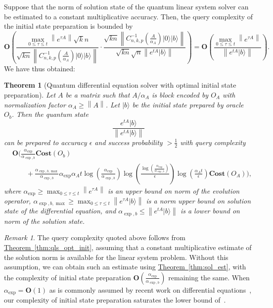 \documentclass[letterpaper,onecolumn,11pt,accepted=2026-02-14]{quantumarticle}
\newcommand{\norm}[1]{\left\lVert#1\right\rVert}
\newtheorem{theorem}{Theorem}
\theoremstyle{remark}
\newtheorem*{remark}{Remark}
\theoremstyle{plain}
\newcommand{\thm}[1]{\hyperref[thm:#1]{Theorem~\ref*{thm:#1}}}
\newcommand{\ket}[1]{|#1\rangle}
\begin{document}
Suppose that the norm of solution state of the quantum linear system solver can be estimated to a constant multiplicative accuracy. Then, the query complexity of the initial state preparation is bounded by
\begin{equation}
    \mathbf{O}\left(\frac{\max_{0\leq\tau\leq t}\norm{e^{\tau A}}\sqrt{k}n}{\sqrt{kn}\norm{C_{n,k,p}^{-1}\left(\frac{A}{\alpha_A}\right)\ket{0}\ket{b}}}
    \cdot\frac{\sqrt{kn}\norm{C_{n,k,p}^{-1}\left(\frac{A}{\alpha_A}\right)\ket{0}\ket{b}}}{\sqrt{kn}\sqrt{n}\norm{e^{tA}\ket{b}}}\right)
    =\mathbf{O}\left(\frac{\max_{0\leq\tau\leq t}\norm{e^{\tau A}}}{\norm{e^{tA}\ket{b}}}\right).
\end{equation}
We have thus obtained:
\begin{theorem}[Quantum differential equation solver with optimal initial state preparation]
\label{thm:diff_eq_init}
Let $A$ be a matrix such that $A/\alpha_A$ is block encoded by $O_A$ with normalization factor $\alpha_A\geq\norm{A}$. Let $\ket{b}$ be the initial state prepared by oracle $O_b$.
Then the quantum state
\begin{equation}
    \frac{e^{tA}\ket{b}}{\norm{e^{tA}\ket{b}}}
\end{equation}
can be prepared to accuracy $\epsilon$ and success probability $>\frac{1}{2}$ with query complexity
\begin{equation}
\begin{aligned}
    &\mathbf{O}\Bigg(\frac{\alpha_{\exp}}{\alpha_{\exp,b}}\mathbf{Cost}\left(O_{b}\right)\\
    &\qquad+\frac{\alpha_{\exp,b,\max}}{\alpha_{\exp,b}}
    \alpha_{\exp}\alpha_At
    \log\left(\frac{\alpha_{\exp}}{\alpha_{\exp,b}}\right)
    \log\left(\frac{\log\left(\frac{\alpha_{\exp}}{\alpha_{\exp,b}}\right)}{\epsilon}\right)
    \log\left(\frac{\alpha_At}{\epsilon}\right)
    \mathbf{Cost}\left(O_{A}\right)\Bigg),
\end{aligned}
\end{equation}
where $\alpha_{\exp}\geq\max_{0\leq\tau\leq t}\norm{e^{\tau A}}$ is an upper bound on norm of the evolution operator, $\alpha_{\exp,b,\max}\geq \max_{0\leq\tau\leq t}\norm{e^{\tau A}\ket{b}}$ is a norm upper bound on solution state of the differential equation, and $\alpha_{\exp,b}\leq\norm{e^{tA}\ket{b}}$ is a lower bound on norm of the solution state.
\end{theorem}
\begin{remark}
The query complexity quoted above follows from \thm{qls_opt_init}, assuming that a constant multiplicative estimate of the solution norm is available for the linear system problem. Without this assumption, we can obtain such an estimate using \thm{sol_est}, with the complexity of initial state preparation $\mathbf{O}\left(\frac{\alpha_{\exp}}{\alpha_{\exp,b}}\right)$ remaining the same.
When $\alpha_{\exp}=\mathbf{O}(1)$ as is commonly assumed by recent work on differential equations~\cite{Krovi2023improvedquantum,BerryCosta22,AnChildsLin23}, our complexity of initial state preparation saturates the lower bound of~\cite[Theorem 10]{Fang2023timemarchingbased}.
\end{remark}
\end{document}
